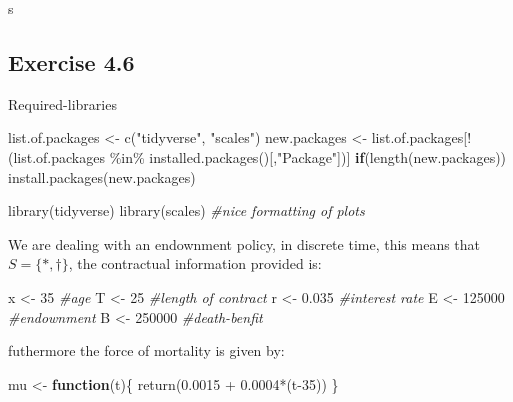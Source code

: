 \documentclass[
]{article}
\newenvironment{Shaded}{\begin{snugshade}}{\end{snugshade}}
\newcommand{\CommentTok}[1]{\textcolor[rgb]{0.56,0.35,0.01}{\textit{#1}}}
\newcommand{\ControlFlowTok}[1]{\textcolor[rgb]{0.13,0.29,0.53}{\textbf{#1}}}
\newcommand{\DecValTok}[1]{\textcolor[rgb]{0.00,0.00,0.81}{#1}}
\newcommand{\FloatTok}[1]{\textcolor[rgb]{0.00,0.00,0.81}{#1}}
\newcommand{\FunctionTok}[1]{\textcolor[rgb]{0.00,0.00,0.00}{#1}}
\newcommand{\NormalTok}[1]{#1}
\newcommand{\OtherTok}[1]{\textcolor[rgb]{0.56,0.35,0.01}{#1}}
\newcommand{\SpecialCharTok}[1]{\textcolor[rgb]{0.00,0.00,0.00}{#1}}
\newcommand{\StringTok}[1]{\textcolor[rgb]{0.31,0.60,0.02}{#1}}
\begin{document}
\newpage

s

\newpage

\hypertarget{exercise-4.6}{%
\subsection{Exercise 4.6}\label{exercise-4.6}}

Required-libraries

\begin{Shaded}
\begin{Highlighting}[]
\NormalTok{list.of.packages }\OtherTok{\textless{}{-}} \FunctionTok{c}\NormalTok{(}\StringTok{"tidyverse"}\NormalTok{, }\StringTok{"scales"}\NormalTok{)}
\NormalTok{new.packages }\OtherTok{\textless{}{-}}\NormalTok{ list.of.packages[}\SpecialCharTok{!}\NormalTok{(list.of.packages }\SpecialCharTok{\%in\%} \FunctionTok{installed.packages}\NormalTok{()[,}\StringTok{"Package"}\NormalTok{])]}
\ControlFlowTok{if}\NormalTok{(}\FunctionTok{length}\NormalTok{(new.packages)) }\FunctionTok{install.packages}\NormalTok{(new.packages)}

\FunctionTok{library}\NormalTok{(tidyverse)}
\FunctionTok{library}\NormalTok{(scales)   }\CommentTok{\#nice formatting of plots}
\end{Highlighting}
\end{Shaded}

We are dealing with an endownment policy, in discrete time, this means
that \(S = \{*, \dagger\}\), the contractual information provided is:

\begin{Shaded}
\begin{Highlighting}[]
\NormalTok{x }\OtherTok{\textless{}{-}} \DecValTok{35}     \CommentTok{\#age}
\NormalTok{T }\OtherTok{\textless{}{-}} \DecValTok{25}     \CommentTok{\#length of contract}
\NormalTok{r }\OtherTok{\textless{}{-}} \FloatTok{0.035}  \CommentTok{\#interest rate }
\NormalTok{E }\OtherTok{\textless{}{-}} \DecValTok{125000} \CommentTok{\#endownment }
\NormalTok{B }\OtherTok{\textless{}{-}} \DecValTok{250000} \CommentTok{\#death{-}benfit}
\end{Highlighting}
\end{Shaded}

futhermore the force of mortality is given by:

\begin{Shaded}
\begin{Highlighting}[]
\NormalTok{mu }\OtherTok{\textless{}{-}} \ControlFlowTok{function}\NormalTok{(t)\{}
  \FunctionTok{return}\NormalTok{(}\FloatTok{0.0015} \SpecialCharTok{+} \FloatTok{0.0004}\SpecialCharTok{*}\NormalTok{(t}\DecValTok{{-}35}\NormalTok{))}
\NormalTok{\}}
\end{Highlighting}
\end{Shaded}
\end{document}
